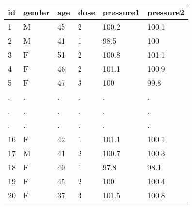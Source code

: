 \documentclass[preview]{standalone}
\begin{document}
\centering \begin{tabular}{llllll}
\hline
id & gender & age & dose & pressure1 & pressure2 \\\hline
1 & M & 45 & 2 & 100.2 & 100.1 \\
2 & M & 41 & 1 & 98.5 & 100 \\
3 & F & 51 & 2 & 100.8 & 101.1 \\
4 & F & 46 & 2 & 101.1 & 100.9 \\
5 & F & 47 & 3 & 100 & 99.8 \\
. & . & . & . & . & . \\
. & . & . & . & . & . \\
. & . & . & . & . & . \\
16 & F & 42 & 1 & 101.1 & 100.1 \\
17 & M & 41 & 2 & 100.7 & 100.3 \\
18 & F & 40 & 1 & 97.8 & 98.1 \\
19 & F & 45 & 2 & 100 & 100.4 \\
20 & F & 37 & 3 & 101.5 & 100.8 \\
\hline
\end{tabular}
\end{document}
